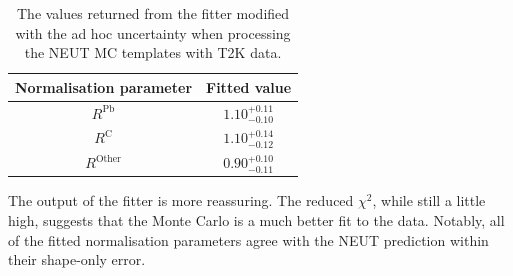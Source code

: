 \begin{table}
  \begin{tabular}{c c }
    Normalisation parameter & Fitted value \\ \hline \hline
    $R^{\textrm{Pb}}$ & $1.10^{+0.11}_{-0.10}$  \\
    $R^{\textrm{C}}$ & $1.10^{+0.14}_{-0.12}$  \\
    $R^{\textrm{Other}}$ & $0.90^{+0.10}_{-0.11}$  \\
  \end{tabular}
  \caption{The values returned from the fitter modified with the ad hoc uncertainty  when processing the NEUT MC templates with T2K data.}
  \label{table:NEUTMCTemplatesT2KDataFitParametersWithFudge}
\end{table}
\newline
\newline
The output of the fitter is more reassuring.  The reduced $\chi^2$, while still a little high, suggests that the Monte Carlo is a much better fit to the data.  Notably, all of the fitted normalisation parameters agree with the NEUT prediction within their shape-only error.

